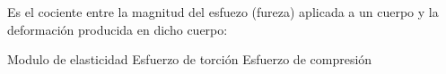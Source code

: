 
\question Es el cociente entre la magnitud del esfuezo (fureza) aplicada
          a un cuerpo y la deformación producida en dicho cuerpo:

  \begin{oneparchoices}
    \CorrectChoice Modulo de elasticidad
    \choice Esfuerzo de torción
    \choice Esfuerzo de compresión
  \end{oneparchoices}
